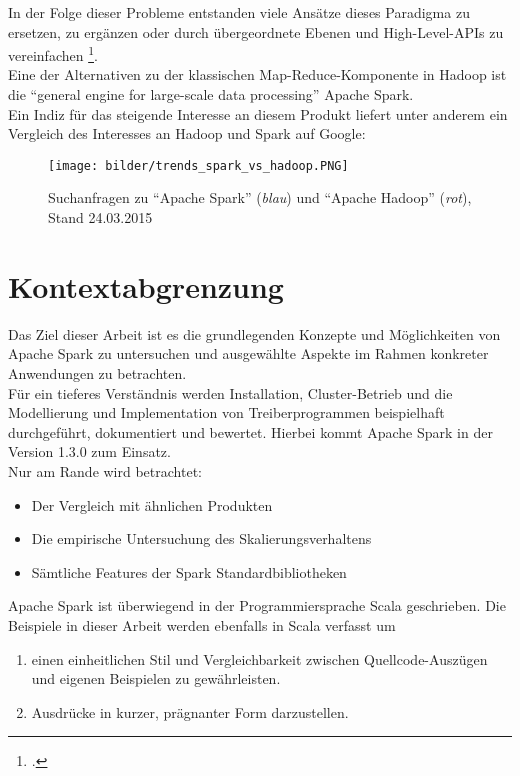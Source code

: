 In der Folge dieser Probleme entstanden viele Ansätze dieses Paradigma zu ersetzen, zu ergänzen oder durch übergeordnete Ebenen und High-Level-APIs zu vereinfachen \footcite{Sin14}.\\

Eine der Alternativen zu der klassischen Map-Reduce-Komponente in Hadoop ist die "`general engine for large-scale data processing"' Apache Spark.\\

Ein Indiz für das steigende Interesse an diesem Produkt liefert unter anderem ein Vergleich des Interesses an Hadoop und Spark auf Google:\\

\begin{figure}[h]
\texttt{[image: bilder/trends\_spark\_vs\_hadoop.PNG]}
\caption[Google Trends]{Suchanfragen zu "`Apache Spark"' (\textit{blau}) und "`Apache Hadoop"' (\textit{rot}), Stand 24.03.2015 \cite{googletrends}}
\end{figure}

\section{Kontextabgrenzung}
Das Ziel dieser Arbeit ist es die grundlegenden Konzepte und Möglichkeiten von Apache Spark zu untersuchen und ausgewählte Aspekte im Rahmen konkreter Anwendungen zu betrachten.\\

Für ein tieferes Verständnis werden Installation, Cluster-Betrieb und die Modellierung und Implementation von Treiberprogrammen beispielhaft durchgeführt, dokumentiert und bewertet. Hierbei kommt Apache Spark in der Version 1.3.0 zum Einsatz.\\

Nur am Rande wird betrachtet:
\begin{itemize}
	\item Der Vergleich mit ähnlichen Produkten
	\item Die empirische Untersuchung des Skalierungsverhaltens
	\item Sämtliche Features der Spark Standardbibliotheken
\end{itemize}

Apache Spark ist überwiegend in der Programmiersprache Scala geschrieben. Die Beispiele in dieser Arbeit werden ebenfalls in Scala verfasst um
\begin{enumerate}
	\item einen einheitlichen Stil und Vergleichbarkeit zwischen Quellcode-Auszügen und eigenen Beispielen zu gewährleisten.
	\item Ausdrücke in kurzer, prägnanter Form darzustellen.
\end{enumerate}
